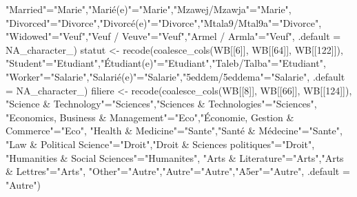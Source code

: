 \documentclass[
]{article}
\newenvironment{Shaded}{\begin{snugshade}}{\end{snugshade}}
\newcommand{\AttributeTok}[1]{\textcolor[rgb]{0.77,0.63,0.00}{#1}}
\newcommand{\ConstantTok}[1]{\textcolor[rgb]{0.00,0.00,0.00}{#1}}
\newcommand{\DecValTok}[1]{\textcolor[rgb]{0.00,0.00,0.81}{#1}}
\newcommand{\FunctionTok}[1]{\textcolor[rgb]{0.00,0.00,0.00}{#1}}
\newcommand{\NormalTok}[1]{#1}
\newcommand{\OtherTok}[1]{\textcolor[rgb]{0.56,0.35,0.01}{#1}}
\newcommand{\StringTok}[1]{\textcolor[rgb]{0.31,0.60,0.02}{#1}}
\begin{document}
\begin{Shaded}
\begin{Highlighting}[]
  \StringTok{"Married"}\OtherTok{=}\StringTok{"Marie"}\NormalTok{,}\StringTok{"Marié(e)"}\OtherTok{=}\StringTok{"Marie"}\NormalTok{,}\StringTok{"Mzawej/Mzawja"}\OtherTok{=}\StringTok{"Marie"}\NormalTok{,}
  \StringTok{"Divorced"}\OtherTok{=}\StringTok{"Divorce"}\NormalTok{,}\StringTok{"Divorcé(e)"}\OtherTok{=}\StringTok{"Divorce"}\NormalTok{,}\StringTok{"Mtala9/Mtal9a"}\OtherTok{=}\StringTok{"Divorce"}\NormalTok{,}
  \StringTok{"Widowed"}\OtherTok{=}\StringTok{"Veuf"}\NormalTok{,}\StringTok{"Veuf / Veuve"}\OtherTok{=}\StringTok{"Veuf"}\NormalTok{,}\StringTok{"Armel / Armla"}\OtherTok{=}\StringTok{"Veuf"}\NormalTok{,}
  \AttributeTok{.default =} \ConstantTok{NA\_character\_}\NormalTok{)}
\NormalTok{statut }\OtherTok{\textless{}{-}} \FunctionTok{recode}\NormalTok{(}\FunctionTok{coalesce\_cols}\NormalTok{(WB[[}\DecValTok{6}\NormalTok{]], WB[[}\DecValTok{64}\NormalTok{]], WB[[}\DecValTok{122}\NormalTok{]]),}
  \StringTok{"Student"}\OtherTok{=}\StringTok{"Etudiant"}\NormalTok{,}\StringTok{"Étudiant(e)"}\OtherTok{=}\StringTok{"Etudiant"}\NormalTok{,}\StringTok{"Taleb/Talba"}\OtherTok{=}\StringTok{"Etudiant"}\NormalTok{,}
  \StringTok{"Worker"}\OtherTok{=}\StringTok{"Salarie"}\NormalTok{,}\StringTok{"Salarié(e)"}\OtherTok{=}\StringTok{"Salarie"}\NormalTok{,}\StringTok{"5eddem/5eddema"}\OtherTok{=}\StringTok{"Salarie"}\NormalTok{,}
  \AttributeTok{.default =} \ConstantTok{NA\_character\_}\NormalTok{)}
\NormalTok{filiere }\OtherTok{\textless{}{-}} \FunctionTok{recode}\NormalTok{(}\FunctionTok{coalesce\_cols}\NormalTok{(WB[[}\DecValTok{8}\NormalTok{]], WB[[}\DecValTok{66}\NormalTok{]], WB[[}\DecValTok{124}\NormalTok{]]),}
  \StringTok{"Science \& Technology"}\OtherTok{=}\StringTok{"Sciences"}\NormalTok{,}\StringTok{"Sciences \& Technologies"}\OtherTok{=}\StringTok{"Sciences"}\NormalTok{,}
  \StringTok{"Economics, Business \& Management"}\OtherTok{=}\StringTok{"Eco"}\NormalTok{,}\StringTok{"Économie, Gestion \& Commerce"}\OtherTok{=}\StringTok{"Eco"}\NormalTok{,}
  \StringTok{"Health \& Medicine"}\OtherTok{=}\StringTok{"Sante"}\NormalTok{,}\StringTok{"Santé \& Médecine"}\OtherTok{=}\StringTok{"Sante"}\NormalTok{,}
  \StringTok{"Law \& Political Science"}\OtherTok{=}\StringTok{"Droit"}\NormalTok{,}\StringTok{"Droit \& Sciences politiques"}\OtherTok{=}\StringTok{"Droit"}\NormalTok{,}
  \StringTok{"Humanities \& Social Sciences"}\OtherTok{=}\StringTok{"Humanites"}\NormalTok{,}
  \StringTok{"Arts \& Literature"}\OtherTok{=}\StringTok{"Arts"}\NormalTok{,}\StringTok{"Arts \& Lettres"}\OtherTok{=}\StringTok{"Arts"}\NormalTok{,}
  \StringTok{"Other"}\OtherTok{=}\StringTok{"Autre"}\NormalTok{,}\StringTok{"Autre"}\OtherTok{=}\StringTok{"Autre"}\NormalTok{,}\StringTok{"A5er"}\OtherTok{=}\StringTok{"Autre"}\NormalTok{, }\AttributeTok{.default =} \StringTok{"Autre"}\NormalTok{)}


\end{Highlighting}
\end{Shaded}
\end{document}
